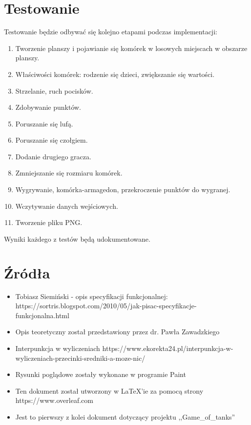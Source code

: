\documentclass{article}
\begin{document}
\clearpage
\section{Testowanie}
Testowanie będzie odbywać się kolejno etapami podczas implementacji: 
\begin{enumerate}
    \item Tworzenie planszy i pojawianie się komórek w losowych miejscach w obszarze planszy.
    \item Właściwości komórek: rodzenie się dzieci, zwiększanie się wartości.
    \item Strzelanie, ruch pocisków.
    \item Zdobywanie punktów.
    \item Poruszanie się lufą.
    \item Poruszanie się czołgiem.
    \item Dodanie drugiego gracza.
    \item Zmniejszanie się rozmiaru komórek.
    \item Wygrywanie, komórka-armagedon, przekroczenie punktów do wygranej.
    \item Wczytywanie danych wejściowych.
    \item Tworzenie pliku PNG.
\end{enumerate}
\par Wyniki każdego z testów będą udokumentowane.

\section{Źródła}

\begin{itemize}
    \item Tobiasz Siemiński - opis specyfikacji funkcjonalnej: https://sortris.blogspot.com/2010/05/jak-pisac-specyfikacje-funkcjonalna.html
     
    \item Opis teoretyczny został przedstawiony przez dr. Pawła Zawadzkiego
    
    \item Interpunkcja w wyliczeniach https://www.ekorekta24.pl/interpunkcja-w-wyliczeniach-przecinki-sredniki-a-moze-nic/
    \item Rysunki poglądowe zostały wykonane w programie Paint

    \item Ten dokument został utworzony w LaTeX'ie za pomocą strony https://www.overleaf.com
    
    \item Jest to pierwszy z kolei dokument dotyczący projektu ,,Game\_of\_tanks''
\end{itemize}
\end{document}
